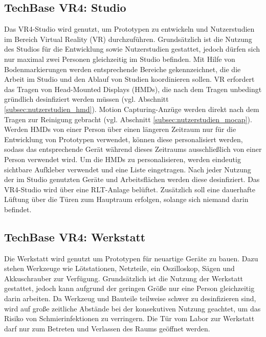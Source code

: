 \subsection{TechBase VR4: Studio}\label{subsec:labore_vr4_stuio}


\noindent
Das VR4-Studio wird genutzt, um Prototypen zu entwickeln und Nutzerstudien im Bereich Virtual Reality (VR) durchzuführen.
Grundsätzlich ist die Nutzung des Studios für die Entwicklung sowie Nutzerstudien gestattet, jedoch dürfen sich nur maximal zwei Personen gleichzeitig im Studio befinden.
Mit Hilfe von Bodenmarkierungen werden entsprechende Bereiche gekennzeichnet, die die Arbeit im Studio und den Ablauf von Studien koordinieren sollen.
VR erfordert das Tragen von Head-Mounted Displays (HMDs), die nach dem Tragen unbedingt gründlich desinfiziert werden müssen (vgl. Abschnitt \ref{subsec:nutzerstudien_hmd}).
Motion Capturing-Anzüge werden direkt nach dem Tragen zur Reinigung gebracht (vgl. Abschnitt \ref{subsec:nutzerstudien_mocap}).
Werden HMDs von einer Person über einen längeren Zeitraum nur für die Entwicklung von Prototypen verwendet, können diese personalisiert werden, sodass das entsprechende Gerät während dieses Zeitraums ausschließlich von einer Person verwendet wird.
Um die HMDs zu personalisieren, werden eindeutig sichtbare Aufkleber verwendet und eine Liste eingetragen.
Nach jeder Nutzung der im Studio genutzten Geräte und Arbeitsflächen werden diese desinfiziert.
Das VR4-Studio wird über eine RLT-Anlage belüftet.
Zusätzlich soll eine dauerhafte Lüftung über die Türen zum Hauptraum erfolgen, solange sich niemand darin befindet.

\subsection{TechBase VR4: Werkstatt}\label{subsec:labore_vr4_werkstatt}


\noindent
Die Werkstatt wird genutzt um Prototypen für neuartige Geräte zu bauen.
Dazu stehen Werkzeuge wie Lötstationen, Netzteile, ein Oszilloskop, Sägen und Akkuschrauber zur Verfügung.
Grundsätzlich ist die Nutzung der Werkstatt gestattet, jedoch kann aufgrund der geringen Größe nur eine Person gleichzeitig darin arbeiten.
Da Werkzeug und Bauteile teilweise schwer zu desinfizieren sind, wird auf große zeitliche Abstände bei der konsekutiven Nutzung geachtet, um das Risiko von Schmierinfektionen zu verringern.
Die Tür vom Labor zur Werkstatt darf nur zum Betreten und Verlassen des Raums geöffnet werden.
